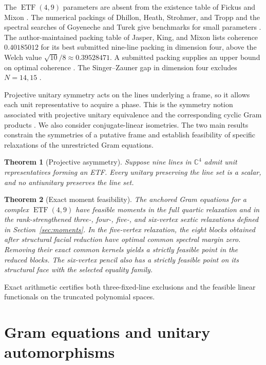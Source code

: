 \documentclass[11pt]{article}
\newtheorem{theorem}{Theorem}
\newcommand{\C}{\mathbb C}
\begin{document}
The $\operatorname{ETF}(4,9)$ parameters are absent from the existence table of Fickus and Mixon \cite[Table~2]{fickusmixon}. The numerical packings of Dhillon, Heath, Strohmer, and Tropp and the spectral searches of Goyeneche and Turek give benchmarks for small parameters \cite[Table~2]{dhillon}\cite[Sections~VI--VII]{goyeneche}. The author-maintained packing table of Jasper, King, and Mixon lists coherence $0.40185012$ for its best submitted nine-line packing in dimension four, above the Welch value $\sqrt{10}/8\approx0.39528471$. A submitted packing supplies an upper bound on optimal coherence \cite{gameofsloanes}. The Singer--Zauner gap in dimension four excludes $N=14,15$ \cite{gap}.

Projective unitary symmetry acts on the lines underlying a frame, so it allows each unit representative to acquire a phase. This is the symmetry notion associated with projective unitary equivalence and the corresponding cyclic Gram products \cite{chienwaldron}. We also consider conjugate-linear isometries. The two main results constrain the symmetries of a putative frame and establish feasibility of specific relaxations of the unrestricted Gram equations.

\begin{theorem}[Projective asymmetry]\label{thm:asymmetry}
Suppose nine lines in $\C^4$ admit unit representatives forming an ETF. Every unitary preserving the line set is a scalar, and no antiunitary preserves the line set.
\end{theorem}

\begin{theorem}[Exact moment feasibility]\label{thm:moment}
The anchored Gram equations for a complex $\operatorname{ETF}(4,9)$ have feasible moments in the full quartic relaxation and in the rank-strengthened three-, four-, five-, and six-vertex sextic relaxations defined in Section~\ref{sec:moments}. In the five-vertex relaxation, the eight blocks obtained after structural facial reduction have optimal common spectral margin zero. Removing their exact common kernels yields a strictly feasible point in the reduced blocks. The six-vertex pencil also has a strictly feasible point on its structural face with the selected equality family.
\end{theorem}

Exact arithmetic certifies both three-fixed-line exclusions and the feasible linear functionals on the truncated polynomial spaces.

\section{Gram equations and unitary automorphisms}\label{sec:unitary}
\end{document}
